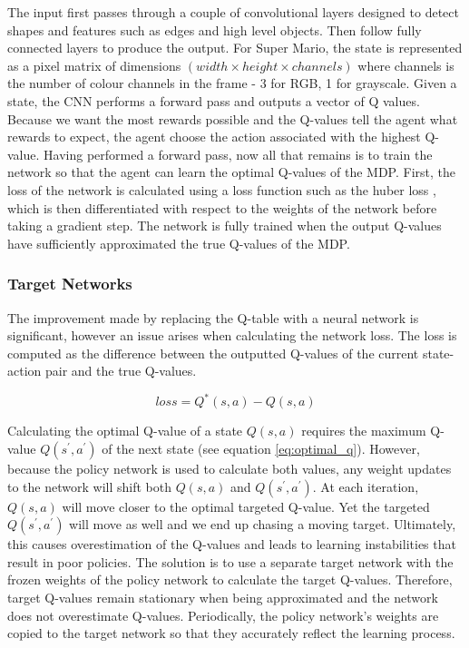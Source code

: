 \documentclass[notitlepage,a4paper,11pt]{article}
\begin{document}
The input first passes through a couple of convolutional layers designed to detect shapes and features such as edges and high level objects. Then follow fully connected layers to produce the output. For Super Mario, the state is represented as a pixel matrix of dimensions $(width \times height \times channels)$ where channels is the number of colour channels in the frame - 3 for RGB, 1 for grayscale. Given a state, the CNN performs a forward pass and outputs a vector of Q values. Because we want the most rewards possible and the Q-values tell the agent what rewards to expect, the agent choose the action associated with the highest Q-value. Having performed a forward pass, now all that remains is to train the network so that the agent can learn the optimal Q-values of the MDP. First, the loss of the network is calculated using a loss function such as the huber loss \cite{huber1992robust}, which is then differentiated with respect to the weights of the network before taking a gradient step. The network is fully trained when the output Q-values have sufficiently approximated the true Q-values of the MDP.  

\subsubsection{Target Networks}
The improvement made by replacing the Q-table with a neural network is significant, however an issue arises when calculating the network loss. The loss is computed as the difference between the outputted Q-values of the current state-action pair and the true Q-values. 

\begin{equation} \label{eq:q_loss}
	loss = Q^*(s,a) - Q(s,a) 
\end{equation}

Calculating the optimal Q-value of a state $Q(s,a)$ requires the maximum Q-value $Q(s^\prime, a^\prime)$ of the next state (see equation \ref{eq:optimal_q}). However, because the policy network is used to calculate both values, any weight updates to the network will shift both $Q(s,a)$ and $Q(s^\prime, a^\prime)$. At each iteration, $Q(s,a)$ will move closer to the optimal targeted Q-value. Yet the targeted $Q(s^\prime, a^\prime)$ will move as well and we end up chasing a moving target. Ultimately, this causes overestimation of the Q-values and leads to learning instabilities that result in poor policies. The solution is to use a separate target network with the frozen weights of the policy network to calculate the target Q-values. Therefore, target Q-values remain stationary when being approximated and the network does not overestimate Q-values. Periodically, the policy network's weights are copied to the target network so that they accurately reflect the learning process.
\end{document}
